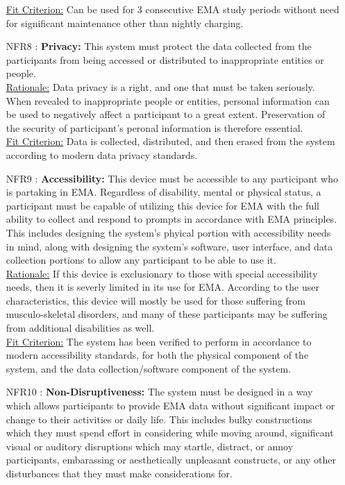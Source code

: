 \documentclass[12pt]{article}
\begin{document}
\begin{itemize}
\underline{Fit Criterion:} Can be used for 3 consecutive EMA study periods without need for significant maintenance other than nightly charging.\\

\item[NFR8 \label{NFR8}:]
  \textbf{Privacy:} This system must protect the data collected from the participants from being accessed or distributed to inappropriate entities or people. \\


\underline{Rationale:} Data privacy is a right, and one that must be taken seriously. When revealed to inappropriate people or entities, personal information can be used to negatively affect a participant to a great extent. Preservation of the security of participant's peronal information is therefore essential.\\

\underline{Fit Criterion:} Data is collected, distributed, and then erased from the system according to modern data privacy standards.\\

\item[NFR9 \label{NFR9}:]
  \textbf{Accessibility:} This device must be accessible to any participant who is partaking in EMA. Regardless of disability, mental or physical status, a participant must be capable of utilizing this device for EMA with the full ability to collect and respond to prompts in accordance with EMA principles. This includes designing the system's phyical portion with accessibility needs in mind, along with designing the system's software, user interface, and data collection portions to allow any participant to be able to use it.\\

\underline{Rationale:} If this device is exclusionary to those with special accessibility needs, then it is severly limited in its use for EMA. According to the user characteristics, this device will mostly be used for those suffering from musculo-skeletal disorders, and many of these participants may be suffering from additional disabilities as well.\\

\underline{Fit Criterion:} The system has been verified to perform in accordance to modern accessibility standards, for both the physical component of the system, and the data collection/software component of the system.\\

\item[NFR10 \label{NFR10}:]
  \textbf{Non-Disruptiveness:} The system must be designed in a way which allows participants to provide EMA data without significant impact or change to their activities or daily life. This includes bulky constructions which they must spend effort in considering while moving around, significant visual or auditory disruptions which may startle, distract, or annoy participants, embarassing or aesthetically unpleasant constructs, or any other disturbances that they must make considerations for.\\


\end{itemize}
\end{document}
